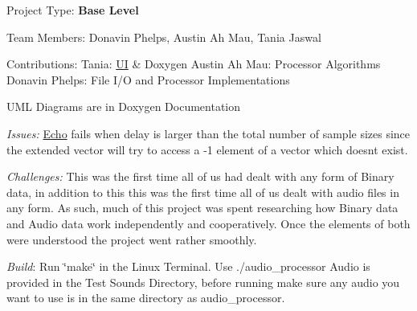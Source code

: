 Project Type\+: {\bfseries{Base Level}}

Team Members\+: Donavin Phelps, Austin Ah Mau, Tania Jaswal

Contributions\+: Tania\+: \mbox{\hyperlink{classUI}{UI}} \& Doxygen Austin Ah Mau\+: Processor Algorithms Donavin Phelps\+: File I/O and Processor Implementations

U\+ML Diagrams are in Doxygen Documentation

{\itshape Issues\+:} \mbox{\hyperlink{classEcho}{Echo}} fails when delay is larger than the total number of sample sizes since the extended vector will try to access a -\/1 element of a vector which doesn\textquotesingle{}t exist.

{\itshape Challenges\+:} This was the first time all of us had dealt with any form of Binary data, in addition to this this was the first time all of us dealt with audio files in any form. As such, much of this project was spent researching how Binary data and Audio data work independently and cooperatively. Once the elements of both were understood the project went rather smoothly.

{\itshape Build}\+: Run \char`\"{}make\char`\"{} in the Linux Terminal. Use ./audio\+\_\+processor Audio is provided in the Test Sounds Directory, before running make sure any audio you want to use is in the same directory as audio\+\_\+processor. 